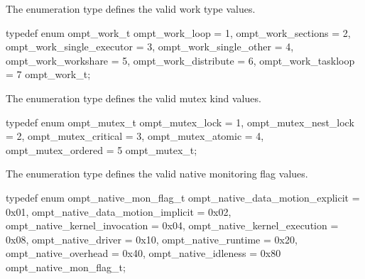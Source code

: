 \label{sec:ompt_work_t}

\summary
The  enumeration type defines the valid work type values.

\format
\begin{ccppspecific}
\begin{omptEnum}
typedef enum ompt_work_t {
  ompt_work_loop               = 1,
  ompt_work_sections           = 2,
  ompt_work_single_executor    = 3,
  ompt_work_single_other       = 4,
  ompt_work_workshare          = 5,
  ompt_work_distribute         = 6,
  ompt_work_taskloop           = 7
} ompt_work_t;
\end{omptEnum}
\end{ccppspecific}



\label{sec:ompt_mutex_t}

\summary
The  enumeration type defines the valid mutex kind values.

\format
\begin{ccppspecific}
\begin{omptEnum}
typedef enum ompt_mutex_t {
  ompt_mutex_lock                     = 1,
  ompt_mutex_nest_lock                = 2,
  ompt_mutex_critical                 = 3,
  ompt_mutex_atomic                   = 4,
  ompt_mutex_ordered                  = 5
} ompt_mutex_t;
\end{omptEnum}
\end{ccppspecific}



\label{sec:ompt_native_mon_flag_t}

\summary
The  enumeration type defines the valid native 
monitoring flag values.

\format
\begin{ccppspecific}
\begin{omptEnum}
typedef enum ompt_native_mon_flag_t {
  ompt_native_data_motion_explicit    = 0x01,
  ompt_native_data_motion_implicit    = 0x02,
  ompt_native_kernel_invocation       = 0x04,
  ompt_native_kernel_execution        = 0x08,
  ompt_native_driver                  = 0x10,
  ompt_native_runtime                 = 0x20,
  ompt_native_overhead                = 0x40,
  ompt_native_idleness                = 0x80
} ompt_native_mon_flag_t;
\end{omptEnum}
\end{ccppspecific}




